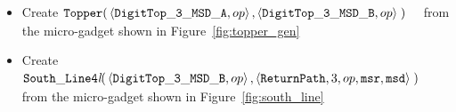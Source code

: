 \begin{itemize}
\begin{itemize}
            \item Create
            $\begin{aligned}[t]
                {\tt Topper}(& \left\langle {\tt DigitTop\_3\_MSD\_A}, op \right\rangle,
                               \left\langle {\tt DigitTop\_3\_MSD\_B}, op \right\rangle \;)
            \end{aligned}$ from the micro-gadget shown in Figure~\ref{fig:topper_gen}


            \item Create
            $\begin{aligned}[t]
                {\tt South\_Line4\textit{l}}(& \left\langle {\tt DigitTop\_3\_MSD\_B}, op                      \right\rangle,
                                               \left\langle {\tt ReturnPath}, 3,            op, {\tt msr}, {\tt msd}\right\rangle \;)
            \end{aligned}$ \\ from the micro-gadget shown in Figure~\ref{fig:south_line}
        \end{itemize}

    \end{itemize}


